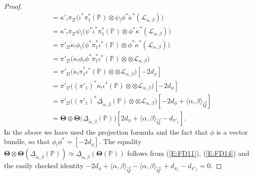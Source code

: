 \documentclass[a4paper,10pt]{amsart}
\def\a{\alpha}
\def\FD{\boldsymbol{\Theta}}
\numberwithin{equation}{section}
\begin{document}
\begin{proof}
\begin{equation}
\begin{split}
&=\kappa'_!\dot{\pi}_{2!} \big( \dot{\iota}^* \pi_1^*(\mathbb{P}) \otimes \psi_!\phi^* \dot{\kappa}^* (\mathcal{L}_{\alpha,\beta})\big)\\
&=\kappa'_!\dot{\pi}_{2!}\psi_! \big( \psi^*\dot{\iota}^* \pi_1^*(\mathbb{P}) \otimes \phi^* \dot{\kappa}^* (\mathcal{L}_{\alpha,\beta})\big)\\
&=\pi'_{2!}\dot{\kappa}_{!}\phi_! \big( \phi^* \dot{\pi}_1^*\iota^*(\mathbb{P}) \otimes \phi^* \dot{\kappa}^* (\mathcal{L}_{\alpha,\beta})\big)\\
&=\pi'_{2!} \big( \dot{\kappa}_!\phi_!\phi^* \dot{\pi}_1^*\iota^*(\mathbb{P}) \otimes \otimes \mathcal{L}_{\alpha,\beta}\big)\\
&=\pi'_{2!} \big( \dot{\kappa}_! \dot{\pi}_1^*\iota^*(\mathbb{P}) \otimes \otimes \mathcal{L}_{\alpha,\beta}\big)[-2d_{\phi}]\\
&=\pi'_{2!} \big( (\pi'_1)^*\kappa_!\iota^*(\mathbb{P}) \otimes \otimes \mathcal{L}_{\alpha,\beta}\big)[-2d_{\phi}]\\
&=\pi'_{2!} \big( (\pi'_1)^*\underline{\Delta}_{\a,\beta}(\mathbb{P}) \otimes \otimes \mathcal{L}_{\alpha,\beta}\big)[-2d_{\phi}+\langle \a , \beta \rangle_{\vec{Q}}]\\
&=\FD \otimes \FD\big(\underline{\Delta}_{\a,\beta}(\mathbb{P})\big)[2d_{\phi}+\langle \a , \beta \rangle_{\vec{Q}}-d_{\pi'_1}].
\end{split}
\end{equation}
In the above we have used the projection formula and the fact that $\phi$ is a vector bundle, so that $\phi_!\phi^*=[-2d_{\phi}]$. The equality $\FD\otimes \FD(\underline{\Delta}_{\a,\beta}(\mathbb{P})) \simeq \underline{\Delta}_{\a,\beta}(\FD(\mathbb{P}))$ follows from
(\ref{E:FD11}), (\ref{E:FD14}) and the easily checked identity  $-2d_{\phi} + \langle \a, \beta \rangle_{\vec{Q}} - \langle \a, \beta \rangle_{\vec{Q}'}  +d_{\pi_1}- d_{\pi'_1}=0$.

\vspace{.1in}


\end{proof}
\end{document}
